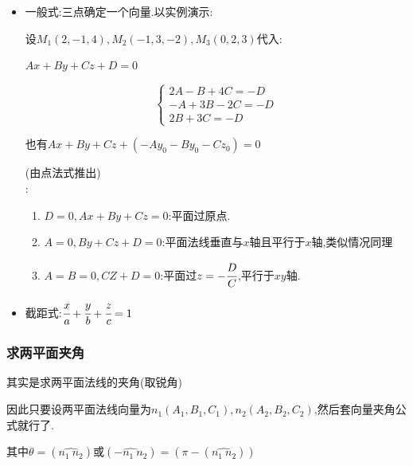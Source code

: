 \documentclass[UTF8,12pt]{ctexbook}
\begin{document}
{{{{\begin{itemize}
{              设一点$M_0:(x_0,y_0,z_0)$,法线向量:$\vec{n} = (A,B,C)$

              设$M(x,y,z),\vec{M_0M}=(x - x_0,y - y_0,z - z_0),\vec{n} \cdot \vec{M_0M} = 0$

              平面的点法式方程为:$A(x - x_0) + B(y - y_0) + C(z - z_0) = 0$
              }
        \item {
              一般式:三点确定一个向量.以实例演示:

              设$M_1(2,-1,4),M_2(-1,3,-2),M_3(0,2,3)$代入:

              $Ax + By + Cz + D = 0$

              $$
                \begin{cases}
                  2A - B + 4C = -D \\
                  -A + 3B -2C = -D \\
                  2B + 3C = -D
                \end{cases}
              $$

              也有$Ax + By + Cz + (-Ay_0 - By_0 - Cz_0) = 0$

              (由点法式推出)\\

              :
              \begin{enumerate}
                \item $D = 0,Ax + By + Cz = 0$:平面过原点.
                \item $A = 0,By + Cz + D = 0$:平面法线垂直与$x$轴且平行于$x$轴,类似情况同理
                \item $A = B = 0,CZ + D = 0$:平面过$z = -\cfrac{D}{C}$,平行于$xy$轴.
              \end{enumerate}
              }
        \item 截距式:$\cfrac{x}{a} + \cfrac{y}{b} + \cfrac{z}{c} = 1$
      \end{itemize}
    }%

    \subsubsection{求两平面夹角}{
      其实是求两平面法线的夹角(取锐角)

      因此只要设两平面法线向量为$n_1(A_1,B_1,C_1),n_2(A_2,B_2,C_2)$,然后套向量夹角公式就行了.

      其中$\theta = (\widehat{n_1\ n_2})$或$(\widehat{-n_1\ n_2}) = (\pi - (\widehat{n_1\ n_2}))$

}}}}
\end{document}
